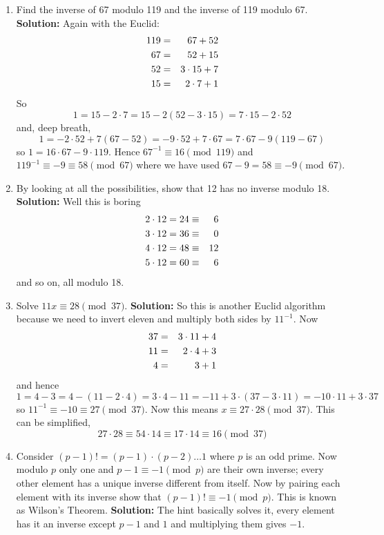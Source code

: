 \documentclass[12pt]{article}
\begin{document}
\begin{enumerate}
\item Find the inverse of 67 modulo 119 and the inverse of 119 modulo 67. \textbf{Solution: } Again with the Euclid:
\begin{eqnarray}
119&=&67+52\cr
67&=&52+15\cr
52&=&3\cdot 15+7\cr
15&=&2\cdot 7+1
\end{eqnarray}
So 
\begin{equation}
1=15-2\cdot 7 = 15-2(52-3\cdot 15)=7\cdot 15-2\cdot 52
\end{equation}
and, deep breath, 
\begin{equation}
1=-2\cdot 52+7(67-52)=-9\cdot 52+7\cdot 67=7\cdot 67-9(119-67)
\end{equation}
so $1=16\cdot 67-9\cdot 119$. Hence $67^{-1}\equiv 16\pmod {119}$ and $119^{-1}\equiv -9\equiv 58\pmod{67}$ where we have used $67-9=58\equiv -9\pmod{67}$.


\item By looking at all the possibilities, show that 12 has no inverse modulo 18. \textbf{Solution:} Well this is boring 
\begin{eqnarray}
2\cdot 12=24&\equiv&6\cr 
3\cdot 12=36&\equiv&0\cr 
4\cdot 12=48&\equiv&12\cr 
5\cdot 12=60&\equiv&6
\end{eqnarray}
and so on, all modulo 18. 

\item Solve $11x\equiv 28 \pmod {37}$. \textbf{Solution: } So this is
  another Euclid algorithm because we need to invert eleven and
  multiply both sides by $11^{-1}$. Now
\begin{eqnarray}
37&=&3\cdot 11+4\cr
11&=&2\cdot 4+3\cr
4&=&3+1
\end{eqnarray}
and hence 
\begin{equation}
1=4-3=4-(11-2\cdot 4)=3\cdot 4-11=-11+3\cdot (37-3\cdot 11)=-10\cdot 11+3\cdot 37
\end{equation}
so $11^{-1}\equiv -10\equiv 27\pmod {37}$. Now this means $x\equiv 27\cdot 28\pmod {37}$. This can be simplified, 
\begin{equation}
27\cdot 28\equiv 54 \cdot 14\equiv 17\cdot 14\equiv 16\pmod{37}
\end{equation}



\item Consider $(p-1)!=(p-1)\cdot (p-2)\ldots 1$ where $p$ is an odd
  prime. Now modulo $p$ only one and $p-1\equiv -1\pmod p$ are their
  own inverse; every other element has a unique inverse different from
  itself. Now by pairing each element with its inverse show that
  $(p-1)!\equiv -1 \pmod p$. This is known as Wilson's Theorem. \textbf{Solution: } The hint basically solves it, every element has it an inverse except $p-1$ and $1$ and multiplying them gives $-1$.


\end{enumerate}
\end{document}
